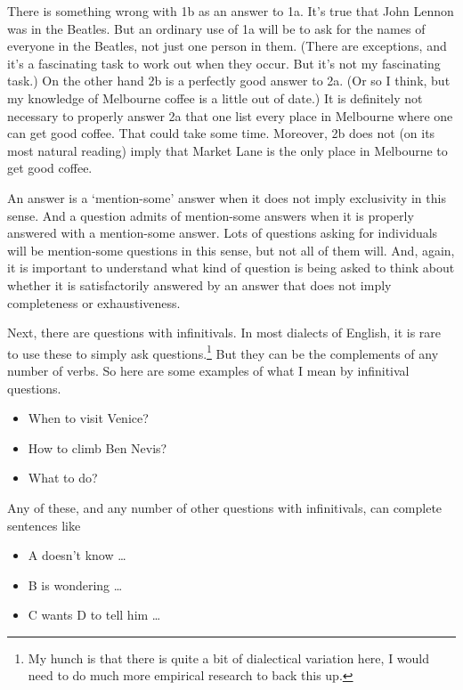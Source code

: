 \documentclass[11pt,]{book}
\providecommand{\tightlist}{%
  \setlength{\itemsep}{0pt}\setlength{\parskip}{0pt}}
\let\rmarkdownfootnote\footnote%
\def\footnote{\protect\rmarkdownfootnote}
\begin{document}
There is something wrong with 1b as an answer to 1a. It's true that John Lennon was in the Beatles. But an ordinary use of 1a will be to ask for the names of everyone in the Beatles, not just one person in them. (There are exceptions, and it's a fascinating task to work out when they occur. But it's not my fascinating task.) On the other hand 2b is a perfectly good answer to 2a. (Or so I think, but my knowledge of Melbourne coffee is a little out of date.) It is definitely not necessary to properly answer 2a that one list every place in Melbourne where one can get good coffee. That could take some time. Moreover, 2b does not (on its most natural reading) imply that Market Lane is the only place in Melbourne to get good coffee.

An answer is a `mention-some' answer when it does not imply exclusivity in this sense. And a question admits of mention-some answers when it is properly answered with a mention-some answer. Lots of questions asking for individuals will be mention-some questions in this sense, but not all of them will. And, again, it is important to understand what kind of question is being asked to think about whether it is satisfactorily answered by an answer that does not imply completeness or exhaustiveness.

Next, there are questions with infinitivals. In most dialects of English, it is rare to use these to simply ask questions.\footnote{My hunch is that there is quite a bit of dialectical variation here, I would need to do much more empirical research to back this up.} But they can be the complements of any number of verbs. So here are some examples of what I mean by infinitival questions.

\begin{itemize}
\tightlist
\item
  When to visit Venice?
\item
  How to climb Ben Nevis?
\item
  What to do?
\end{itemize}

Any of these, and any number of other questions with infinitivals, can complete sentences like

\begin{itemize}
\tightlist
\item
  A doesn't know \ldots{}
\item
  B is wondering \ldots{}
\item
  C wants D to tell him \ldots{}
\end{itemize}
\end{document}
